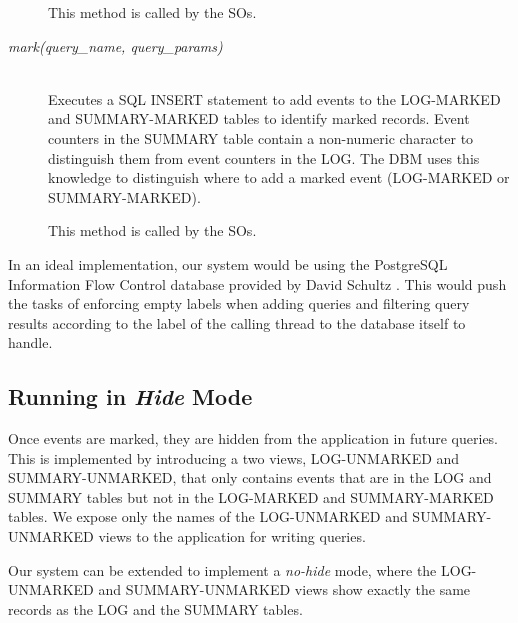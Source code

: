 \begin{description}
    This method is called by the SOs.
  \item[\emph{mark(query\_name, query\_params)}] \ \\
    Executes a SQL INSERT statement to add events
    to the LOG-MARKED and SUMMARY-MARKED tables to
    identify marked records.
    Event counters in the SUMMARY table contain
    a non-numeric character to distinguish them from
    event counters in the LOG. The DBM uses 
    this knowledge to distinguish
    where to add a marked event (LOG-MARKED or 
    SUMMARY-MARKED).
    
    This method is called by the SOs.
\end{description}

In an ideal implementation, our system would be using the PostgreSQL Information Flow Control database provided by David Schultz \cite{das}. This would push the tasks of enforcing empty labels when adding queries and filtering query results according to the label of the calling thread to the database itself to handle.

\subsection{Running in \emph{Hide} Mode}

Once events are marked, they are hidden from the application in future queries. This is implemented by introducing a two views, LOG-UNMARKED and SUMMARY-UNMARKED, that only contains events that are in the LOG and SUMMARY tables but not in the LOG-MARKED and SUMMARY-MARKED tables. We expose only the names of the LOG-UNMARKED and SUMMARY-UNMARKED views to the application for writing queries.

Our system can be extended to implement a \emph{no-hide} mode, where the LOG-UNMARKED and SUMMARY-UNMARKED views show exactly the same records as the LOG and the SUMMARY tables.

